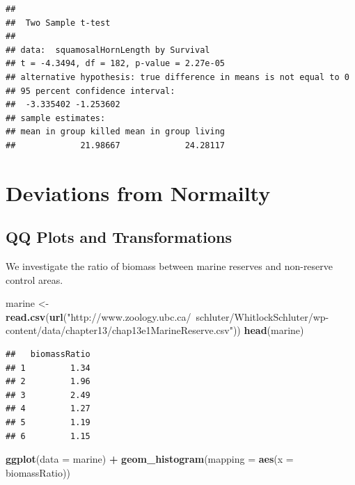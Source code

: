 \documentclass[]{article}
\newenvironment{Shaded}{\begin{snugshade}}{\end{snugshade}}
\newcommand{\DataTypeTok}[1]{\textcolor[rgb]{0.13,0.29,0.53}{#1}}
\newcommand{\KeywordTok}[1]{\textcolor[rgb]{0.13,0.29,0.53}{\textbf{#1}}}
\newcommand{\NormalTok}[1]{#1}
\newcommand{\OperatorTok}[1]{\textcolor[rgb]{0.81,0.36,0.00}{\textbf{#1}}}
\newcommand{\StringTok}[1]{\textcolor[rgb]{0.31,0.60,0.02}{#1}}
\begin{document}
\begin{verbatim}
## 
##  Two Sample t-test
## 
## data:  squamosalHornLength by Survival
## t = -4.3494, df = 182, p-value = 2.27e-05
## alternative hypothesis: true difference in means is not equal to 0
## 95 percent confidence interval:
##  -3.335402 -1.253602
## sample estimates:
## mean in group killed mean in group living 
##             21.98667             24.28117
\end{verbatim}

\hypertarget{deviations-from-normailty}{%
\section{Deviations from Normailty}\label{deviations-from-normailty}}

\hypertarget{qq-plots-and-transformations}{%
\subsection{QQ Plots and
Transformations}\label{qq-plots-and-transformations}}

We investigate the ratio of biomass between marine reserves and
non-reserve control areas.

\begin{Shaded}
\begin{Highlighting}[]
\NormalTok{marine <-}\StringTok{ }\KeywordTok{read.csv}\NormalTok{(}\KeywordTok{url}\NormalTok{(}\StringTok{"http://www.zoology.ubc.ca/~schluter/WhitlockSchluter/wp-content/data/chapter13/chap13e1MarineReserve.csv"}\NormalTok{))}
\KeywordTok{head}\NormalTok{(marine)}
\end{Highlighting}
\end{Shaded}

\begin{verbatim}
##   biomassRatio
## 1         1.34
## 2         1.96
## 3         2.49
## 4         1.27
## 5         1.19
## 6         1.15
\end{verbatim}

\begin{Shaded}
\begin{Highlighting}[]
\KeywordTok{ggplot}\NormalTok{(}\DataTypeTok{data =}\NormalTok{ marine) }\OperatorTok{+}
\StringTok{  }\KeywordTok{geom_histogram}\NormalTok{(}\DataTypeTok{mapping =} \KeywordTok{aes}\NormalTok{(}\DataTypeTok{x =}\NormalTok{ biomassRatio))}
\end{Highlighting}
\end{Shaded}
\end{document}
